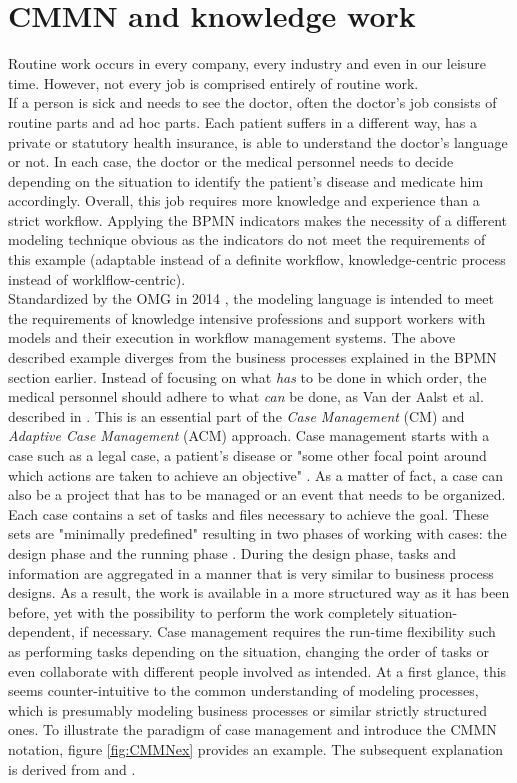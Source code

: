 \section{CMMN and knowledge work}
Routine work occurs in every company, every industry and even in our leisure time. However, not every job is comprised entirely of routine work.
\\
If a person is sick and needs to see the doctor, often the doctor's job consists of routine parts and ad hoc parts. Each patient suffers in a different way, has a private or statutory health insurance, is able to understand the doctor's language or not. In each case, the doctor or the medical personnel needs to decide depending on the situation to identify the patient's disease and medicate him accordingly. Overall, this job requires more knowledge and experience than a strict workflow. Applying the BPMN indicators makes the necessity of a different modeling technique obvious as the indicators do not meet the requirements of this example (adaptable instead of a definite workflow, knowledge-centric process instead of worklflow-centric).\\
Standardized by the OMG in 2014 \cite{CMMNspec2014}, the modeling language is intended to meet the requirements of knowledge intensive professions and support workers with models and their execution in workflow management systems. 
The above described example diverges from the business processes explained in the BPMN section earlier. Instead of focusing on what \textit{has} to be done in which order, the medical personnel should adhere to what \textit{can} be done, as Van der Aalst et al. described in \cite{aalst2005}. This is an essential part of the \textit{Case Management} (CM) and \textit{Adaptive Case Management} (ACM) approach. Case management starts with a case such as a legal case, a patient's disease or "some other focal point around which actions are taken to achieve an objective" \cite{CMMNspec2014}. As a matter of fact, a case can also be a project that has to be managed or an event that needs to be organized. \\
Each case contains a set of tasks and files necessary to achieve the goal. These sets are "minimally predefined" \cite{CMMNspec2014} resulting in two phases of working with cases: the design phase and the running phase \cite{CMMNspec2014}. During the design phase, tasks and information are aggregated in a manner that is very similar to business process designs. As a result, the work is available in a more structured way as it has been before, yet with the possibility to perform the work completely situation-dependent, if necessary. Case management requires the run-time flexibility such as performing tasks depending on the situation, changing the order of tasks or even collaborate with different people involved as intended. 
At a first glance, this seems counter-intuitive to the common understanding of modeling processes, which is presumably modeling business processes or similar strictly structured ones. To illustrate the paradigm of case management and introduce the CMMN notation, figure \ref{fig:CMMNex} provides an example. The subsequent explanation is derived from \cite{CMMNspec2014} and \cite{hinkelmann2015}.

